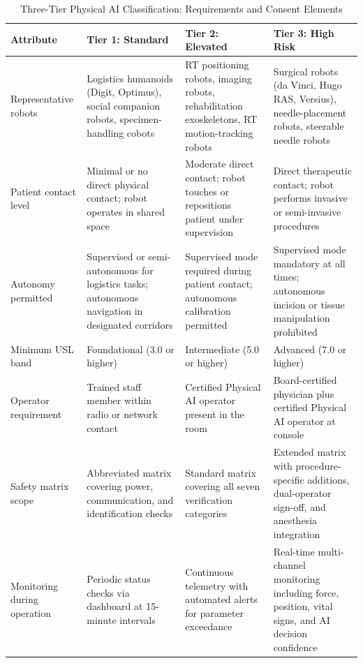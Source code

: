 \begin{table}[H]
\centering
\caption{Three-Tier Physical AI Classification: Requirements and Consent Elements}
\label{tab:three-tier-detail}
\scriptsize
\begin{tabularx}{\textwidth}{>{\raggedright\arraybackslash}p{2cm} >{\raggedright\arraybackslash}X >{\raggedright\arraybackslash}X >{\raggedright\arraybackslash}X}
\toprule
\textbf{Attribute} & \textbf{Tier 1: Standard} & \textbf{Tier 2: Elevated} & \textbf{Tier 3: High Risk} \\
\midrule
Representative robots & Logistics humanoids (Digit, Optimus), social companion robots, specimen-handling cobots & RT positioning robots, imaging robots, rehabilitation exoskeletons, RT motion-tracking robots & Surgical robots (da Vinci, Hugo RAS, Versius), needle-placement robots, steerable needle robots \\
\midrule
Patient contact level & Minimal or no direct physical contact; robot operates in shared space & Moderate direct contact; robot touches or repositions patient under supervision & Direct therapeutic contact; robot performs invasive or semi-invasive procedures \\
\midrule
Autonomy permitted & Supervised or semi-autonomous for logistics tasks; autonomous navigation in designated corridors & Supervised mode required during patient contact; autonomous calibration permitted & Supervised mode mandatory at all times; autonomous incision or tissue manipulation prohibited \\
\midrule
Minimum USL band & Foundational (3.0 or higher) & Intermediate (5.0 or higher) & Advanced (7.0 or higher) \\
\midrule
Operator requirement & Trained staff member within radio or network contact & Certified Physical AI operator present in the room & Board-certified physician plus certified Physical AI operator at console \\
\midrule
Safety matrix scope & Abbreviated matrix covering power, communication, and identification checks & Standard matrix covering all seven verification categories & Extended matrix with procedure-specific additions, dual-operator sign-off, and anesthesia integration \\
\midrule
Monitoring during operation & Periodic status checks via dashboard at 15-minute intervals & Continuous telemetry with automated alerts for parameter exceedance & Real-time multi-channel monitoring including force, position, vital signs, and AI decision confidence \\

\end{tabularx}
\end{table}
